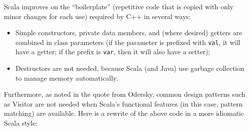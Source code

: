 \documentclass[11pt]{article}
\begin{document}

Scala improves on the ``boilerplate'' (repetitive code that is
copied with only minor changes for each use) required by C++ in
several ways:
\begin{itemize}
\item Simple constructors, private data members, and (where desired)
getters are combined in class parameters (if the parameter is
prefixed with \verb|val|, it will have a getter; if the prefix is
\verb|var|, then it will also have a setter);
\item Destructors are not needed, because Scala (and Java) use
garbage collection to manage memory automatically.
\end{itemize}
Furthermore, as noted in the quote from Odersky, common design
patterns such as Visitor are not needed when Scala's functional
features (in this case, pattern matching) are available. Here is a
rewrite of the above code in a more idiomatic Scala style:

\end{document}
